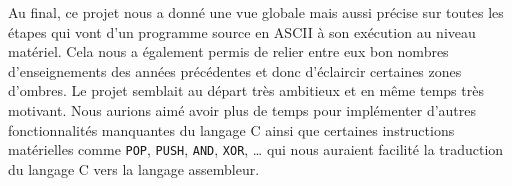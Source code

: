 Au final, ce projet nous a donné une vue globale mais aussi précise sur toutes les étapes qui vont d’un programme source en ASCII à son exécution au niveau matériel. Cela nous a également permis de relier entre eux bon nombres d’enseignements des années précédentes et donc d’éclaircir certaines zones d’ombres. Le projet semblait au départ très ambitieux et en même temps très motivant. Nous aurions aimé avoir plus de temps pour implémenter d’autres fonctionnalités manquantes du langage C ainsi que certaines instructions matérielles comme \texttt{POP}, \texttt{PUSH}, \texttt{AND}, \texttt{XOR}, \ldots{} qui nous auraient facilité la traduction du langage C vers la langage assembleur.
